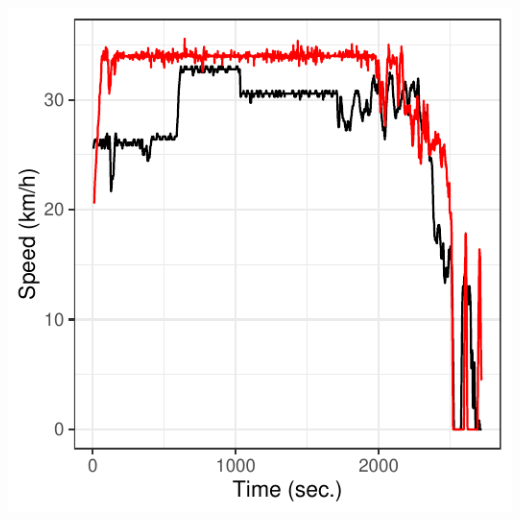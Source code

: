\documentclass[letterpaper,9pt,twocolumn,twoside,]{pinp}
\begin{document}
\begin{center}\includegraphics{report_issaclee_files/figure-latex/unnamed-chunk-7-1} \end{center}





\end{document}

